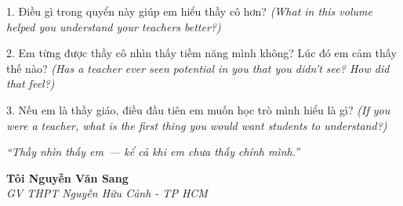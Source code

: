\begin{tuhocnhanh}
1. Điều gì trong quyển này giúp em hiểu thầy cô hơn? \textit{(What in this volume helped you understand your teachers better?)}

2. Em từng được thầy cô nhìn thấy tiềm năng mình không? Lúc đó em cảm thấy thế nào? \textit{(Has a teacher ever seen potential in you that you didn't see? How did that feel?)}

3. Nếu em là thầy giáo, điều đầu tiên em muốn học trò mình hiểu là gì? \textit{(If you were a teacher, what is the first thing you would want students to understand?)}
\end{tuhocnhanh}

\begin{center}
\textit{\color{chalkgold}``Thầy nhìn thấy em~--- kể cả khi em chưa thấy chính mình.''}
\end{center}

\begin{flushright}
\textbf{Tôi Nguyễn Văn Sang}\\
\textit{GV THPT Nguyễn Hữu Cảnh - TP HCM}
\end{flushright}

\ngancach
